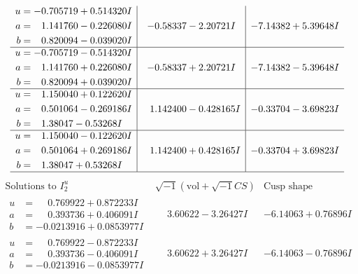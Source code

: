 \documentclass[1p]{elsarticle_modified}
\theoremstyle{definition}
\newcommand{\I}{\sqrt{-1}}
\begin{document}
$$\begin{array}{c|c|c}
\begin{aligned}
u &= -0.705719 + 0.514320 I \\
a &= \phantom{-}1.141760 - 0.226080 I \\
b &= \phantom{-}0.820094 - 0.039020 I\end{aligned}
 & -0.58337 - 2.20721 I & -7.14382 + 5.39648 I \\ \hline\begin{aligned}
u &= -0.705719 - 0.514320 I \\
a &= \phantom{-}1.141760 + 0.226080 I \\
b &= \phantom{-}0.820094 + 0.039020 I\end{aligned}
 & -0.58337 + 2.20721 I & -7.14382 - 5.39648 I \\ \hline\begin{aligned}
u &= \phantom{-}1.150040 + 0.122620 I \\
a &= \phantom{-}0.501064 - 0.269186 I \\
b &= \phantom{-}1.38047 - 0.53268 I\end{aligned}
 & \phantom{-}1.142400 - 0.428165 I & -0.33704 - 3.69823 I \\ \hline\begin{aligned}
u &= \phantom{-}1.150040 - 0.122620 I \\
a &= \phantom{-}0.501064 + 0.269186 I \\
b &= \phantom{-}1.38047 + 0.53268 I\end{aligned}
 & \phantom{-}1.142400 + 0.428165 I & -0.33704 + 3.69823 I\\
 \hline 
 \end{array}$$\newpage$$\begin{array}{c|c|c}  
\text{Solutions to }I^u_{2}& \I (\text{vol} + \sqrt{-1}CS) & \text{Cusp shape}\\
 \hline 
\begin{aligned}
u &= \phantom{-}0.769922 + 0.872233 I \\
a &= \phantom{-}0.393736 + 0.406091 I \\
b &= -0.0213916 + 0.0853977 I\end{aligned}
 & \phantom{-}3.60622 - 3.26427 I & -6.14063 + 0.76896 I \\ \hline\begin{aligned}
u &= \phantom{-}0.769922 - 0.872233 I \\
a &= \phantom{-}0.393736 - 0.406091 I \\
b &= -0.0213916 - 0.0853977 I\end{aligned}
 & \phantom{-}3.60622 + 3.26427 I & -6.14063 - 0.76896 I \\ \hline\begin{aligned}

\end{aligned}
\end{array}$$
\end{document}
